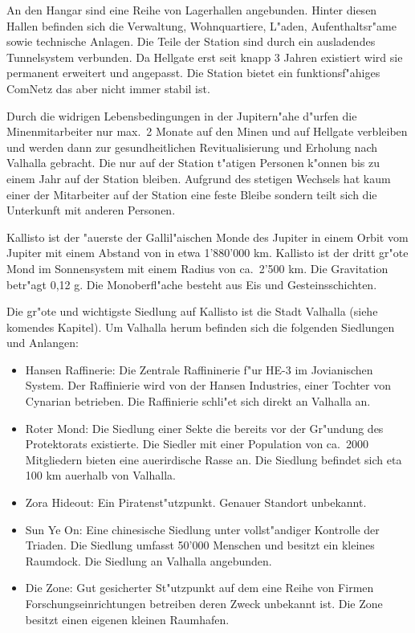 An den Hangar sind eine Reihe von Lagerhallen angebunden. Hinter diesen Hallen befinden sich die Verwaltung, Wohnquartiere, L"aden, Aufenthaltsr"ame sowie technische Anlagen. Die Teile der Station sind durch ein ausladendes Tunnelsystem verbunden. Da Hellgate erst seit knapp 3 Jahren existiert wird sie permanent erweitert und angepasst. Die Station bietet ein funktionsf"ahiges ComNetz das aber nicht immer stabil ist.

Durch die widrigen Lebensbedingungen in der Jupitern"ahe d"urfen die Minenmitarbeiter nur max.~2 Monate auf den Minen und auf Hellgate verbleiben und werden dann zur gesundheitlichen Revitualisierung und Erholung nach Valhalla gebracht. Die nur auf der Station t"atigen Personen k"onnen bis zu einem Jahr auf der Station bleiben. Aufgrund des stetigen Wechsels hat kaum einer der Mitarbeiter auf der Station eine feste Bleibe sondern teilt sich die Unterkunft mit anderen Personen.

\clearpage\newpage
{}

Kallisto ist der "au\3erste der Gallil"aischen Monde des Jupiter in einem Orbit vom Jupiter mit einem Abstand von in
etwa 1'880'000 km. Kallisto ist der dritt gr"o\3te Mond im Sonnensystem mit einem Radius von ca.~2'500 km. Die
Gravitation betr"agt 0,12 g. Die Monoberfl"ache besteht aus Eis und Gesteinsschichten.

Die gr"o\3te und wichtigste Siedlung auf Kallisto ist die Stadt Valhalla (siehe komendes Kapitel). Um Valhalla herum befinden
sich die folgenden Siedlungen und Anlangen:

\begin{itemize}
    \item Hansen Raffinerie: Die Zentrale Raffininerie f"ur HE-3 im Jovianischen System. Der Raffinierie wird von der Hansen 
    Industries, einer Tochter von Cynarian betrieben. Die Raffinierie schli"e\3t sich direkt an Valhalla an.
    \item Roter Mond: Die Siedlung einer Sekte die bereits vor der Gr"undung des Protektorats existierte. Die Siedler mit einer Population von ca.~2000 Mitgliedern bieten eine au\3erirdische Rasse an. Die Siedlung befindet sich eta 100 km au\3erhalb von Valhalla.
    \item Zora Hideout: Ein Piratenst"utzpunkt. Genauer Standort unbekannt.
    \item Sun Ye On: Eine chinesische Siedlung unter vollst"andiger Kontrolle der Triaden. Die Siedlung umfasst 50'000 Menschen und besitzt ein kleines Raumdock. Die Siedlung an Valhalla angebunden.
    \item Die Zone: Gut gesicherter St"utzpunkt auf dem eine Reihe von Firmen Forschungseinrichtungen betreiben deren Zweck unbekannt ist. Die Zone besitzt einen eigenen kleinen Raumhafen.
\end{itemize}

